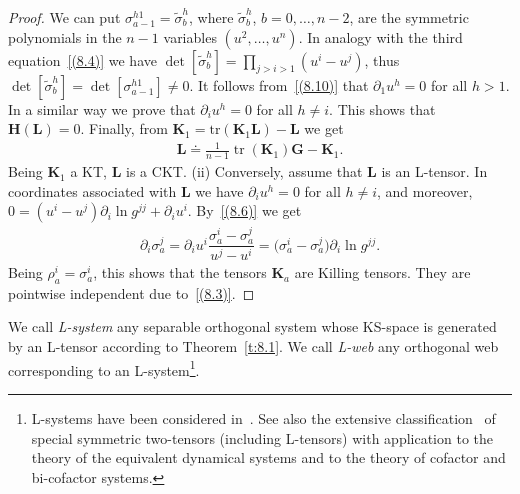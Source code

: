 \documentclass[pdftex]{sigma}
\def\bs{\boldsymbol}
\numberwithin{equation}{section}
\begin{document}
\begin{proof}
We can put $\sigma_{a-1}^{h1}=\tilde\sigma_b^h$, where $\tilde\sigma_b^h$, $b=0,\ldots, n-2$, are the symmetric polynomials in the $n-1$ variables $(u^2,\ldots,u^n)$. In analogy with the third equation~\eqref{(8.4)} we have $\det[\tilde\sigma_b^h]=\prod\limits_{j>i>1}(u^i-u^j)$, thus $\det[\tilde\sigma_b^h]=\det[\sigma_{a-1}^{h1}]\neq 0$. It follows from~\eqref{(8.10)} that $\partial_1u^h=0$ for all $h>1$. In a similar way we prove that
$\partial_iu^h=0$  for all $h\neq i$. This shows that $\bs H(\bs L)=0$.
Finally, from $\bs K_1=\text{tr}(\bs K_1\bs L)-\bs L$ we get
\begin{gather}
\bs L\doteq \frac 1{n-1}\operatorname{tr}(\bs K_1) \bs G-\bs K_1.
\label{(8.11)}
\end{gather}
Being $\bs K_1$ a KT, $\bs L$ is a CKT.
(ii) Conversely, assume that $\bs L$ is an L-tensor. In coordinates associated with $\bs L$ we have
$\partial_iu^h=0$ for all $h\neq i$, and moreover, $0=(u^i-u^j)\partial_i\ln g^{jj}+\partial_iu^i$.
By~\eqref{(8.6)} we get
\begin{gather*}
\partial_i\sigma_a^j=\partial_iu^i \dfrac{\sigma_a^i-\sigma_a^j}{u^j-u^i}=\big(\sigma_a^i-\sigma^j_a\big) \partial_i\ln g^{jj}.
\end{gather*}
Being $\rho_a^i=\sigma_a^i$, this shows that the tensors $\bs K_a$ are Killing tensors. They are pointwise independent due to~\eqref{(8.3)}.
\end{proof}

We call {\it L-system} any separable orthogonal system whose KS-space is generated by an L-tensor according to Theorem~\ref{t:8.1}. We call {\it L{\rm -}web} any orthogonal web corresponding to an L-system\footnote{L-systems have been considered in~\cite{Blaszak-Marciniak-2006, Blaszak-Sergyeyev-2005}. See also the  extensive classif\/ication~\cite{Benenti-2005} of special symmetric two-tensors (including L-tensors) with application to the theory of the equivalent dynamical systems and to the theory of cofactor and bi-cofactor systems.\label{pagenote2}}.
\end{document}
